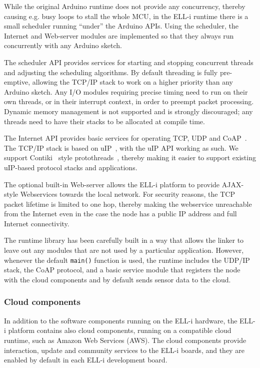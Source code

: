 \documentclass{siamltex}
\begin{document}
While the original Arduino runtime does not provide any concurrency,
thereby causing e.g. busy loops to stall the whole MCU, in the ELL-i
runtime there is a small scheduler running ``under'' the Arduino
APIs.  Using the scheduler, the Internet and Web-server modules are
implemented so that they always run concurrently with any Arduino
sketch.  %

The scheduler API provides services for starting and stopping concurrent
threads and adjusting the scheduling algorithms.  By default threading
is fully pre-emptive, allowing the TCP/IP stack to work on a higher
priority than any Arduino sketch.  Any I/O modules requiring precise
timing need to run on their own threads, or in their interrupt
context, in order to preempt packet processing.  Dynamic memory
management is not supported and is strongly discouraged; any threads
need to have their stacks to be allocated at compile time.

The Internet API provides basic services for operating TCP, UDP and
CoAP~\cite{shelby2013constrained}.  The TCP/IP stack is based on
uIP~\cite{dunkels2006uip}, with the
uIP API working as such.  We support Contiki~\cite{dunkels2004contiki}
style protothreads~\cite{dunkels2006protothreads}, thereby making it easier to
support existing uIP-based protocol stacks and applications.

The optional built-in Web-server allows the ELL-i platform to provide
AJAX-style Webservices towards the local network.  For security
reasons, the TCP packet lifetime is limited to one hop, thereby making
the webservice unreachable from the Internet even in the case the node
has a public IP address and full Internet connectivity.

The runtime library has been carefully built in a way that allows the
linker to leave out any modules that are not used by a particular
application.  However, whenever the default \hbox{\tt main()} function
is used, the runtime includes the UDP/IP stack, the CoAP protocol, and
a basic service module that registers the node with the cloud
components and by default sends sensor data to the cloud.

\subsubsection{Cloud components}

In addition to the software components running on the ELL-i hardware,
the ELL-i platform contains also cloud components, running on a
compatible cloud runtime, such as Amazon Web Services (AWS).
The cloud components provide interaction, update and community
services to the ELL-i boards, and they are enabled by default in each
ELL-i development board.
\end{document}
